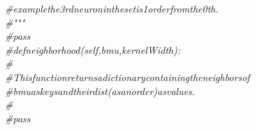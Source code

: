 {{\begin{tabbing}
$${\it{\#\hspace{42pt}example\hspace{6pt}the\hspace{6pt}3rd\hspace{6pt}neuron\hspace{6pt}in\hspace{6pt}the\hspace{6pt}set\hspace{6pt}is\hspace{6pt}1\hspace{6pt}order\hspace{6pt}from\hspace{6pt}the\hspace{6pt}0th.}}\\
{\it{\#\hspace{42pt}\string"\string"\string"}}\\
{\it{\#\hspace{42pt}pass}}\\
{\it{\#\hspace{24pt}def\hspace{6pt}neighborhood(self,bmu,kernelWidth):}}\\
{\it{\#}}\\
{\it{\#\hspace{42pt}This\hspace{6pt}function\hspace{6pt}returns\hspace{6pt}a\hspace{6pt}dictionary\hspace{6pt}containing\hspace{6pt}the\hspace{6pt}neighbors\hspace{6pt}of}}\\
{\it{\#\hspace{42pt}bmu\hspace{6pt}as\hspace{6pt}keys\hspace{6pt}and\hspace{6pt}their\hspace{6pt}dist\hspace{6pt}(as\hspace{6pt}an\hspace{6pt}order)\hspace{6pt}as\hspace{6pt}values.}}\\
{\it{\#}}\\
{\it{\#\hspace{42pt}pass}}
\end{tabbing}}}
